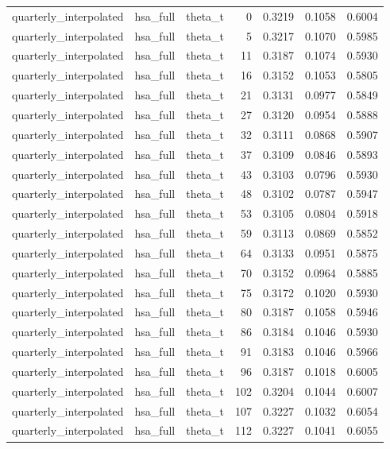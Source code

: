 \begin{tabular}{lllrrrr}
quarterly\_interpolated & hsa\_full & theta\_t & 0 & 0.3219 & 0.1058 & 0.6004 \\
quarterly\_interpolated & hsa\_full & theta\_t & 5 & 0.3217 & 0.1070 & 0.5985 \\
quarterly\_interpolated & hsa\_full & theta\_t & 11 & 0.3187 & 0.1074 & 0.5930 \\
quarterly\_interpolated & hsa\_full & theta\_t & 16 & 0.3152 & 0.1053 & 0.5805 \\
quarterly\_interpolated & hsa\_full & theta\_t & 21 & 0.3131 & 0.0977 & 0.5849 \\
quarterly\_interpolated & hsa\_full & theta\_t & 27 & 0.3120 & 0.0954 & 0.5888 \\
quarterly\_interpolated & hsa\_full & theta\_t & 32 & 0.3111 & 0.0868 & 0.5907 \\
quarterly\_interpolated & hsa\_full & theta\_t & 37 & 0.3109 & 0.0846 & 0.5893 \\
quarterly\_interpolated & hsa\_full & theta\_t & 43 & 0.3103 & 0.0796 & 0.5930 \\
quarterly\_interpolated & hsa\_full & theta\_t & 48 & 0.3102 & 0.0787 & 0.5947 \\
quarterly\_interpolated & hsa\_full & theta\_t & 53 & 0.3105 & 0.0804 & 0.5918 \\
quarterly\_interpolated & hsa\_full & theta\_t & 59 & 0.3113 & 0.0869 & 0.5852 \\
quarterly\_interpolated & hsa\_full & theta\_t & 64 & 0.3133 & 0.0951 & 0.5875 \\
quarterly\_interpolated & hsa\_full & theta\_t & 70 & 0.3152 & 0.0964 & 0.5885 \\
quarterly\_interpolated & hsa\_full & theta\_t & 75 & 0.3172 & 0.1020 & 0.5930 \\
quarterly\_interpolated & hsa\_full & theta\_t & 80 & 0.3187 & 0.1058 & 0.5946 \\
quarterly\_interpolated & hsa\_full & theta\_t & 86 & 0.3184 & 0.1046 & 0.5930 \\
quarterly\_interpolated & hsa\_full & theta\_t & 91 & 0.3183 & 0.1046 & 0.5966 \\
quarterly\_interpolated & hsa\_full & theta\_t & 96 & 0.3187 & 0.1018 & 0.6005 \\
quarterly\_interpolated & hsa\_full & theta\_t & 102 & 0.3204 & 0.1044 & 0.6007 \\
quarterly\_interpolated & hsa\_full & theta\_t & 107 & 0.3227 & 0.1032 & 0.6054 \\
quarterly\_interpolated & hsa\_full & theta\_t & 112 & 0.3227 & 0.1041 & 0.6055 \\

\end{tabular}
